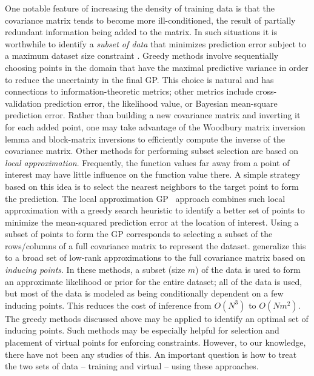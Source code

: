 \label{sec:subset_of_data}
One notable feature of increasing the density of training data is that the covariance matrix tends to become more ill-conditioned, the result of partially redundant information being added to the matrix.
In such situations it is worthwhile to identify a \emph{subset of data} that minimizes prediction error subject to a maximum dataset size constraint . 
Greedy methods involve sequentially choosing points in the domain that have the maximal predictive variance in order to reduce the uncertainty in the final GP.
This choice is natural and has connections to information-theoretic metrics;
other metrics include cross-validation prediction error, the likelihood value, or Bayesian mean-square prediction error. 
Rather than building a new covariance matrix and inverting it for each added point, one may take advantage of the Woodbury matrix inversion lemma and block-matrix inversions to efficiently compute the inverse of the covariance matrix.
Other methods for performing subset selection are based on \emph{local approximation}. 
Frequently, the function values far away from a point of interest may have little influence on the function value there.
A simple strategy based on this idea is to select the nearest neighbors to the target point to form the prediction.
The local approximation GP~ approach combines such local approximation with a greedy search heuristic to identify a better set of points to minimize the mean-squared prediction error at the location of interest.
Using a subset of points to form the GP corresponds to selecting a subset of the rows/columns of a full covariance matrix to represent the dataset.  generalize this to a broad set of low-rank approximations to the full covariance matrix based on \emph{inducing points}. In these methods, a subset (size $m$) of the data is used to form an approximate likelihood or prior for the entire dataset; all of the data is used, but most of the data is modeled as being conditionally dependent on a few inducing points. This reduces the cost of inference from $O(N^3)$ to $O(Nm^2)$. The greedy methods discussed above may be applied to identify an optimal set of inducing points. 
Such methods may be especially helpful for selection and placement of virtual points for enforcing constraints. However, to our knowledge, there have not been any studies of this. An important question is how to treat the two sets of data -- training and virtual -- using these approaches.

